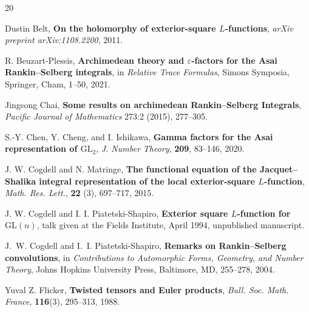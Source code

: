\documentclass[12pt,reqno]{amsart}
\numberwithin{equation}{section}%
\numberwithin{equation}{subsection}
\theoremstyle{definition}
\theoremstyle{remark}
\begin{document}
{\small
\begin{thebibliography}{20}

Dustin Belt,
\textbf{On the holomorphy of exterior-square $L$-functions},
\textit{arXiv preprint arXiv:1108.2200}, 2011.

R. Beuzart-Plessis,
\textbf{Archimedean theory and \(\varepsilon\)-factors for the Asai
Rankin--Selberg integrals},
in \textit{Relative Trace Formulas}, Simons Symposia,
Springer, Cham, 1--50, 2021.



Jingsong Chai, \textbf{Some results on archimedean Rankin–Selberg Integrals}, \textit{Pacific Journal of Mathematics} 273:2 (2015), 277–305.

S.-Y. Chen, Y. Cheng, and I. Ishikawa,
\textbf{Gamma factors for the Asai representation of
\(\mathrm{GL}_2\)},
\textit{J. Number Theory}, \textbf{209}, 83--146, 2020.

J. W. Cogdell and N. Matringe,
\textbf{The functional equation of the Jacquet--Shalika integral
representation of the local exterior-square \(L\)-function},
\textit{Math. Res. Lett.}, \textbf{22} (3), 697--717, 2015.

J. W. Cogdell and I. I. Piatetski-Shapiro,
\textbf{Exterior square \(L\)-function for \(\mathrm{GL}(n)\)},
talk given at the Fields Institute, April 1994, unpublished manuscript.

J.~W. Cogdell and I.~I. Piatetski-Shapiro,
\textbf{Remarks on Rankin--Selberg convolutions}, in
\textit{Contributions to Automorphic Forms, Geometry, and Number Theory},
Johns Hopkins University Press, Baltimore, MD, 255--278, 2004.


Yuval Z. Flicker,
\textbf{Twisted tensors and Euler products},
\textit{Bull. Soc. Math. France}, \textbf{116}(3), 295--313, 1988.


\end{thebibliography}}
\end{document}
